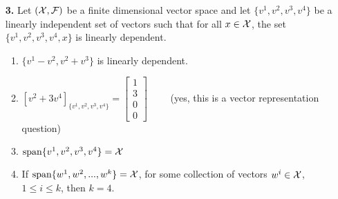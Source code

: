 \documentclass[letterpaper]{article}
\newcommand{\spanof}[1]{\textrm{span} \{ #1 \}}
\begin{document}
\begin{enumerate}
\item[{\bf 3.}]  Let $({\cal X}, {\cal F})$ be a finite dimensional vector space  and let $\{ v^1, v^2, v^3, v^4\}$ be a linearly independent set of vectors such that for all $x \in {\cal X}$, the set $\{ v^1, v^2, v^3, v^4, x\}$ is linearly dependent.
\begin{enumerate}
\setlength{\itemsep}{.15in}
\renewcommand{\labelenumi}{(\alph{enumi})}
\setlength{\itemsep}{.1in}
\item $\{ v^1-v^2, v^2+v^3\}$ is linearly dependent.
\item $\left[ v^2 + 3 v^4 \right]_{\{ v^1, v^2, v^3, v^4 \}} = \left[ \begin{array}{c} 1\\3\\0\\0\end{array} \right]$ ~~~~(yes, this is a vector representation question)
\item $\spanof{ v^1, v^2, v^3, v^4} = {\cal X}$
\item If $\spanof{ w^1, w^2,...,w^k}= {\cal X}$, for some collection of vectors $w^i \in  {\cal X}$, $1 \le i \le k$, then $k=4$.
\end{enumerate}








\end{enumerate}
\end{document}
